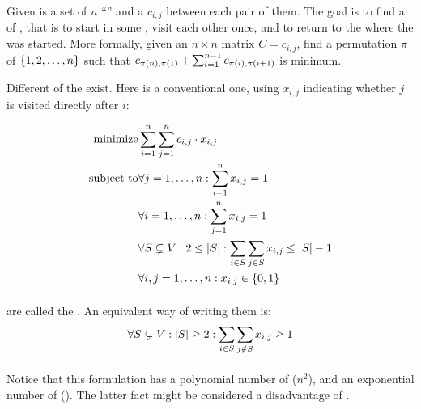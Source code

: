 \begin{definition}
Given is a set of $n$ ``'' and a  $c_{i,j}$ between each pair of them. The goal is to find a  of , that is to start in some , visit each other  once, and to return to the  where the  was started. More formally, given an $n\times n$ matrix $C=c_{i,j}$, find a permutation $\pi$ of $\accl{1,2,\ldots,n}$ such that $c_{\fun{\pi}{n},\fun{\pi}{1}}+\isumieqb[i]{1}{n-1}{c_{\fun{\pi}{i},\fun{\pi}{i+1}}}$ is minimum.
\end{definition}

Different  of the  exist. Here is a conventional one, using  $x_{i,j}$ indicating whether  $j$ is visited directly after  $i$:

\begin{eqnarray}
\mbox{minimize}&\sumieqb[i]{1}{n}{\sumieqb[j]{1}{n}{c_{i,j}\cdot x_{i,j}}}\eqnlab{tsp-m}\\
\mbox{subject to}&\forall\rangei[j]{1}{n}:\sumieqb[i]{1}{n}{x_{i,j}}=1\eqnlab{tsp-c1}\\
&\forall\rangei[i]{1}{n}:\sumieqb[j]{1}{n}{x_{i,j}}=1\eqnlab{tsp-c2}\\
&\forall S\subsetneq V:2\leq\abs{S}:\sumdomain[i]{S}{\sumdomain[j]{S}{x_{i,j}}}\leq\abs{S}-1\eqnlab{tsp-c3}\\
&\forall\rangei[i,j]{1}{n}:x_{i,j}\in\accl{0,1}\eqnlab{tsp-c4}
\end{eqnarray}

\paragraph{}
 are called the . An equivalent way of writing them is:
\begin{equation}
\forall S\subsetneq V:\abs{S}\geq 2:\sumdomain[i]{S}{\sumndomain[j]{S}{x_{i,j}}}\geq 1
\end{equation}

\paragraph{}
Notice that this formulation has a polynomial number of  ($n^2$), and an exponential number of  (). The latter fact might be considered a disadvantage of  .

